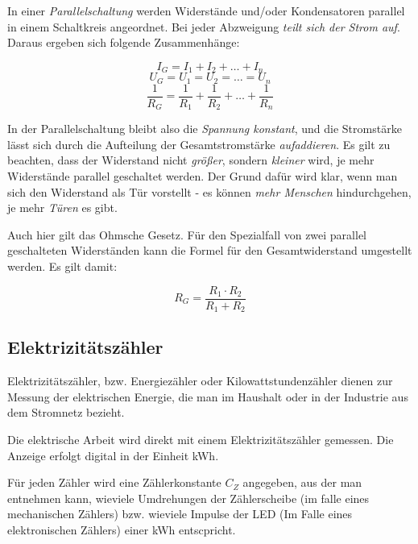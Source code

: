 \documentclass[a4paper, 12pt]{report}
\begin{document}
\begin{multicols}{2}
In einer \emph{Parallelschaltung} werden Widerstände und/oder Kondensatoren
parallel in einem Schaltkreis angeordnet. Bei jeder Abzweigung \emph{teilt
sich der Strom auf}. Daraus ergeben sich folgende Zusammenhänge:

\begin{center}
    \begin{equation}
	I_G = I_1 + I_2 + \dots + I_n
    \end{equation}
    \begin{equation}
	U_G = U_1 = U_2 = \dots = U_n
    \end{equation}
    \begin{equation}
	\frac{1}{R_G} = \frac{1}{R_1} + \frac{1}{R_2} + \dots + \frac{1}{R_n}
    \end{equation}
\end{center}

In der Parallelschaltung bleibt also die \emph{Spannung konstant}, und die
Stromstärke lässt sich durch die Aufteilung der Gesamtstromstärke
\emph{aufaddieren}. Es gilt zu beachten, dass der Widerstand nicht \emph{größer},
sondern \emph{kleiner} wird, je mehr Widerstände parallel geschaltet werden.
Der Grund dafür wird klar, wenn man sich den Widerstand als Tür vorstellt - es
können \emph{mehr Menschen} hindurchgehen, je mehr \emph{Türen} es gibt.

Auch hier gilt das Ohmsche Gesetz. Für den Spezialfall von zwei parallel
geschalteten Widerständen kann die Formel für den Gesamtwiderstand umgestellt
werden. Es gilt damit:
\begin{center}
    \begin{equation}
	R_G = \frac{R_1 \cdot R_2}{R_1 + R_2}
    \end{equation}
\end{center}

\subsection{Elektrizitätszähler}

Elektrizitätszähler, bzw. Energiezähler oder Kilowattstundenzähler dienen zur
Messung der elektrischen Energie, die man im Haushalt oder in der Industrie
aus dem Stromnetz bezieht.

Die elektrische Arbeit wird direkt mit einem Elektrizitätszähler gemessen.
Die Anzeige erfolgt digital in der Einheit kWh.

Für jeden Zähler wird eine Zählerkonstante $C_Z$ angegeben, aus der man
entnehmen kann, wieviele Umdrehungen der Zählerscheibe (im falle eines
mechanischen Zählers) bzw. wieviele Impulse der LED (Im Falle eines
elektronischen Zählers) einer kWh entscpricht.


\end{multicols}
\end{document}
